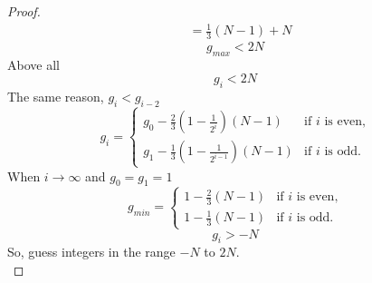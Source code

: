 \documentclass[12pt]{article}
\numberwithin{equation}{section}
\begin{document}
\begin{proof}
\begin{align*}
    &=\frac{1}{3}(N-1)+N
    \end{align*}
    \[g_{max}<2N\]
    Above all
    \[g_i<2N\]
    The same reason, $g_i<g_{i-2}$
    \[g_i=
    \begin{cases}
        g_0-\frac{2}{3}(1-\frac{1}{2^i})(N-1) & \text{if $i$ is even,}\\
        g_1-\frac{1}{3}(1-\frac{1}{2^{i-1}})(N-1) & \text{if $i$ is odd.}
    \end{cases}\]
    When $i \to \infty$ and $g_0=g_1=1$
    \[g_{min}=
    \begin{cases}
        1-\frac{2}{3}(N-1) & \text{if $i$ is even,}\\
        1-\frac{1}{3}(N-1) & \text{if $i$ is odd.}
    \end{cases}\]
    \[g_{i}>-N\]
    So, guess integers in the range $-N$ to $2N$.\\
\end{proof}
\end{document}
